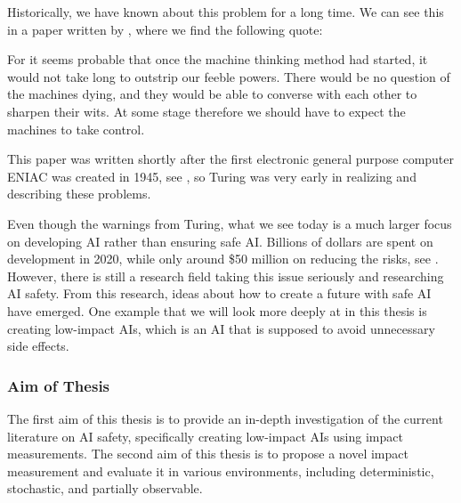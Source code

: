 \documentclass[12pt,A4]{report}
\theoremstyle{definition}
\begin{document}
Historically, we have known about this problem for a long time. We can see this in a paper written by \citet{Turing51}, where we find the following quote:

\begin{displayquote}
  For it seems probable that once the machine thinking method had started, it would not take long to outstrip our feeble powers. There would be no question of the machines dying, and they would be able to converse with each other to sharpen their wits. At some stage therefore we should have to expect the machines to take control.
\end{displayquote}

This paper was written shortly after the first electronic general purpose computer ENIAC was created in 1945, see \citet{wiki:ENIAC}, so Turing was very early in realizing and describing these problems.

Even though the warnings from Turing, what we see today is a much larger focus on developing AI rather than ensuring safe AI. Billions of dollars are spent on development in 2020, while only around \$50 million on reducing the risks, see \citet{80000}. However, there is still a research field taking this issue seriously and researching AI safety. From this research, ideas about how to create a future with safe AI have emerged. One example that we will look more deeply at in this thesis is creating low-impact AIs, which is an AI that is supposed to avoid unnecessary side effects.

\vspace{-4pt}
\subsubsection{Aim of Thesis}
The first aim of this thesis is to provide an in-depth investigation of the current literature on AI safety, specifically creating low-impact AIs using impact measurements. The second aim of this thesis is to propose a novel impact measurement and evaluate it in various environments, including deterministic, stochastic, and partially observable. 
\end{document}
